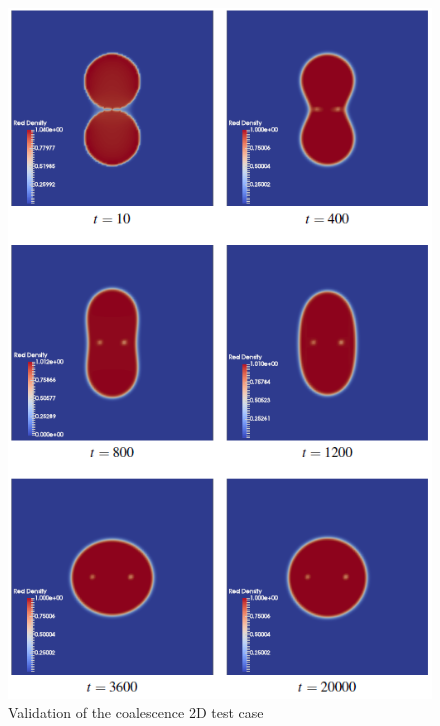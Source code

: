 \documentclass[12pt, openany]{book}
\begin{document}
    \begin{figure}[H]
       	\centering
       	\includegraphics[width=\linewidth]{Resources/Images/AntonioValid/Coalescence2D.PNG}
       	\caption{Validation of the coalescence 2D test case}
       	\label{fig:coal}
    \end{figure}
    
\end{document}
